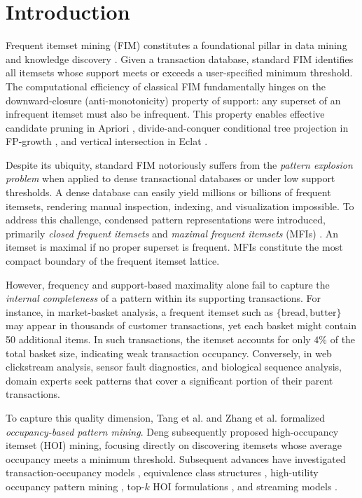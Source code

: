 \documentclass[runningheads,orivec]{llncs}
\begin{document}
\section{Introduction}
\label{sec:intro}

Frequent itemset mining (FIM) constitutes a foundational pillar in data mining and knowledge discovery \cite{agrawal1994fast,aggarwal2014frequent}. Given a transaction database, standard FIM identifies all itemsets whose support meets or exceeds a user-specified minimum threshold. The computational efficiency of classical FIM fundamentally hinges on the downward-closure (anti-monotonicity) property of support: any superset of an infrequent itemset must also be infrequent. This property enables effective candidate pruning in Apriori \cite{agrawal1994fast}, divide-and-conquer conditional tree projection in FP-growth \cite{han2000mining}, and vertical intersection in Eclat \cite{zaki2000scalable}.

Despite its ubiquity, standard FIM notoriously suffers from the \emph{pattern explosion problem} when applied to dense transactional databases or under low support thresholds. A dense database can easily yield millions or billions of frequent itemsets, rendering manual inspection, indexing, and visualization impossible. To address this challenge, condensed pattern representations were introduced, primarily \emph{closed frequent itemsets} \cite{pasquier1999discovering,zaki2002charm,uno2003lcm,vo2015nlist} and \emph{maximal frequent itemsets} (MFIs) \cite{burdick2001mafia,burdick2005mafia,gouda2005genmax,vo2017novel}. An itemset is maximal if no proper superset is frequent. MFIs constitute the most compact boundary of the frequent itemset lattice.

However, frequency and support-based maximality alone fail to capture the \emph{internal completeness} of a pattern within its supporting transactions. For instance, in market-basket analysis, a frequent itemset such as $\{\text{bread}, \text{butter}\}$ may appear in thousands of customer transactions, yet each basket might contain 50 additional items. In such transactions, the itemset accounts for only $4\%$ of the total basket size, indicating weak transaction occupancy. Conversely, in web clickstream analysis, sensor fault diagnostics, and biological sequence analysis, domain experts seek patterns that cover a significant portion of their parent transactions.

To capture this quality dimension, Tang et al. \cite{tang2012incorporating} and Zhang et al. \cite{zhang2015occupancy} formalized \emph{occupancy-based pattern mining}. Deng \cite{deng2020mining} subsequently proposed high-occupancy itemset (HOI) mining, focusing directly on discovering itemsets whose average occupancy meets a minimum threshold. Subsequent advances have investigated transaction-occupancy models \cite{datta2022high}, equivalence class structures \cite{nguyen2023efficient}, high-utility occupancy pattern mining \cite{gan2020huopm,duong2024efficient,park2025sliding}, top-$k$ HOI formulations \cite{ngo2026efficient}, and streaming models \cite{cho2026damped}.
\end{document}
